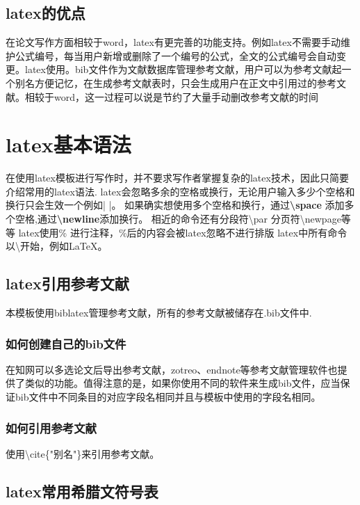 \documentclass[UTF8]{ctexart}
\begin{document}
\subsection{latex的优点}


在论文写作方面相较于word，latex有更完善的功能支持。例如latex不需要手动维护公式编号，每当用户新增或删除了一个编号的公式，全文的公式编号会自动变更。latex使用。bib文件作为文献数据库管理参考文献，用户可以为参考文献起一个别名方便记忆，在生成参考文献表时，只会生成用户在正文中引用过的参考文献。相较于word，这一过程可以说是节约了大量手动删改参考文献的时间
\newpage
\section{latex基本语法}


在使用latex模板进行写作时，并不要求写作者掌握复杂的latex技术，因此只简要介绍常用的latex语法.
latex会忽略多余的空格或换行，无论用户输入多少个空格和换行只会生效一个例如|                                    |。
如果确实想使用多个空格和换行，通过\textbf{\textbackslash space} 添加多个空格,通过\textbf{\textbackslash newline}添加换行。\newline
相近的命令还有分段符\textbackslash par 分页符\textbackslash newpage等等
latex使用\% 进行注释，\%后的内容会被latex忽略不进行排版%
latex中所有命令以\textbackslash 开始，例如\LaTeX 。

\subsection{latex引用参考文献}


本模板使用biblatex管理参考文献，所有的参考文献被储存在.bib文件中.

\subsubsection{如何创建自己的bib文件}

在知网可以多选论文后导出参考文献，zotreo、endnote等参考文献管理软件也提供了类似的功能。值得注意的是，如果你使用不同的软件来生成bib文件，应当保证bib文件中不同条目的对应字段名相同并且与模板中使用的字段名相同。

\subsubsection{如何引用参考文献}
使用\textbackslash cite\{"别名"\}来引用参考文献。

\subsection{latex常用希腊文符号表}
\end{document}
